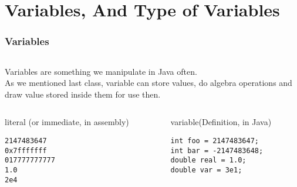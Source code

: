 \documentclass[
  11pt, %
  xcolor=dvipsnames
]{beamer}
\begin{document}
\section{Variables, And Type of Variables}
\begin{frame}[fragile]
	\frametitle{Variables}


	\begin{columns}[c]
		\begin{column}{0.9\textwidth}

			Variables are something we manipulate in Java often.\\

			As we mentioned last class, variable can store values, do algebra operations and draw value stored inside them for use then.

			\begin{columns}[c]
				\begin{column}{0.4\textwidth}

					literal (or immediate, in assembly)

					\begin{lstlisting}
2147483647
0x7fffffff
017777777777
1.0
2e4
\end{lstlisting}

				\end{column}

				\begin{column}{0.4\textwidth}

					variable(Definition, in Java)

					\begin{lstlisting}
int foo = 2147483647;
int bar = -2147483648;
double real = 1.0;
double var = 3e1;
\end{lstlisting}

				\end{column}
			\end{columns}

		\end{column}
	\end{columns}

\end{frame}
\end{document}
